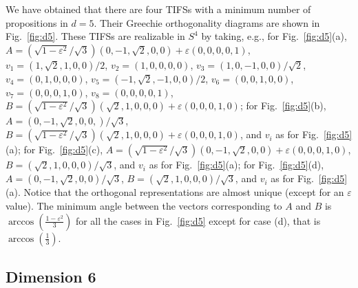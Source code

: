 \documentclass[%
 twocolumn,
 groupedaddress,
 showpacs,
 showkeys,
 preprintnumbers,
 amsmath,amssymb,
 aps,
 pra,
 longbibliography,
 floatfix,
 ]{revtex4-1}
\begin{document}
We have obtained that there are four TIFSs with a minimum number of propositions in $d=5$. Their Greechie orthogonality diagrams are shown in Fig.~\ref{fig:d5}.
These TIFSs are realizable in $S^4$ by taking,
		e.g., for Fig.~\ref{fig:d5}(a),
		$A = (\sqrt{1-\varepsilon^2} / \sqrt{3})({0,-1,\sqrt{2},0,0} )+\varepsilon({0,0,0,0,1})$,
		$v_1 = ({1,\sqrt{2},1,0,0} )/ 2 $,
		$v_2 = ({1,0,0,0,0} )$,
		$v_3 = ({1,0,-1,0,0} )/\sqrt{2}$,
		$v_4 = ({0,1,0,0,0} ) $,
		$v_5 = ({-1,\sqrt{2},-1,0,0} )/ 2$,
		$v_6 = ({0,0,1,0,0} ) $,
		$v_7 = ({0,0,0,1,0} )$,
		$v_{8} = ({0,0,0,0,1} )$,
		$B = (\sqrt{1-\varepsilon^2} / \sqrt{3}) ({\sqrt{2},1,0,0,0})+\varepsilon({0,0,0,1,0})$; for Fig.~\ref{fig:d5}(b),
		$A = ({0,-1,\sqrt{2},0,0,} )/\sqrt{3}$,
		$B = (\sqrt{1-\varepsilon^2} / \sqrt{3}) ({\sqrt{2},1,0,0,0})+\varepsilon({0,0,0,1,0})$,
		and $v_i$ as for Fig.~\ref{fig:d5}(a); for Fig.~\ref{fig:d5}(c),
		$A = (\sqrt{1-\varepsilon^2} / \sqrt{3})({0,-1,\sqrt{2},0,0} )+\varepsilon({0,0,0,1,0})$,
		$B = ({\sqrt{2},1,0,0,0} )/\sqrt{3}$,
		and $v_i$ as for Fig.~\ref{fig:d5}(a); for Fig.~\ref{fig:d5}(d),
		$A = ({0,-1,\sqrt{2},0,0} )/\sqrt{3}$,
		$B = ({\sqrt{2},1,0,0,0} )/\sqrt{3}$,
		and $v_i$ as for Fig.~\ref{fig:d5}(a).
		Notice that the orthogonal representations are almost unique (except for an $\varepsilon$ value).
The minimum angle between the vectors corresponding to $A$ and $B$ is $\arccos\left(\frac{1-\varepsilon^2}{3}\right)$ for all the cases in Fig.~\ref{fig:d5} except for case (d), that is $\arccos\left(\frac{1}{3}\right)$.


\subsection{Dimension 6}

\end{document}
